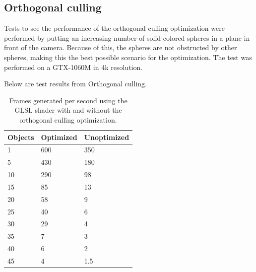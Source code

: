 		\subsection{Orthogonal culling}
		
		Tests to see the performance of the orthogonal culling optimization were
		performed by putting an increasing number of solid-colored spheres in a
		plane in front of the camera. Because of this, the spheres are not
		obstructed by other spheres, making this the best possible scenario for the
		optimization. The test was performed on a GTX-1060M in 4k resolution.

		Below are test results from Orthogonal culling.

			\begin{table}
			\centering
			\begin{tabular}{lll}
				\hline
				Objects & Optimized & Unoptimized \\ 
				\hline
				1       & 600       & 350         \\ 
				5       & 430       & 180         \\			
				10      & 290       & 98          \\
				15      & 85        & 13          \\
				20      & 58        & 9           \\
				25      & 40        & 6           \\
				30      & 29        & 4           \\
				35      & 7         & 3           \\
				40      & 6         & 2           \\
				45      & 4         & 1.5         \\
				\hline
			\end{tabular}
			\caption{Frames generated per second using the GLSL shader with and
				without the orthogonal culling optimization.}
			\end{table}











